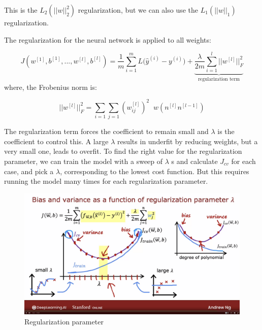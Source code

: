 \documentclass[12pt]{report}
\begin{document}
This is the $L_2 (||w||^2_2) $ regularization, but we can also use the $L_1 (||w||_1)$ regularization.


The regularization for the neural network is applied to all weights:

\begin{equation}
  J(w^{[1]},b^{[1]}, ... , w^{[l]},b^{[l]}) = \frac{1}{m} \sum_{i=1}^{m} L \big( \hat{y}^{(i)} - y^{(i)} \big)+ \underbrace{ \frac{\lambda}{2m} \sum_{i=1}^l ||w^{[l]}||_F^2 }_\text{regularization term}
\end{equation}
where, the Frobenius norm is:

\begin{equation}
 ||w^{[l]}||_F^2 = \sum_{i=1}\sum_{j=1} (w_{ij}^{[l]})^2 \; \; w (n^{[l]} n^{[l-1]} )
\end{equation}


The regularization term forces the coefficient to remain small and $\lambda$ is the coefficient to control this. A large $\lambda$ results in underfit by reducing weights, but a very small one, leads to overfit. To find the right value for the regularization parameter, we can train the model with a sweep of $\lambda$ s and calculate $J_{cv}$ for each case, and pick a $\lambda$, corresponding to the lowest cost function. But this requires running the model many times for each regularization parameter.

\begin{figure}[H]
  \centering
  \includegraphics[trim =0.0cm 0.0cm 0.0cm 0.0cm, clip, scale=0.12]{pics/regularization.png}
  \caption{Regularization parameter}
\end{figure}
\end{document}
